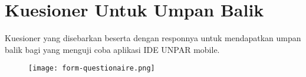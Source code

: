\chapter{Kuesioner Untuk Umpan Balik}
\label{lamp:B}

\def\scl{1}
\def\leg{} 
\def\std{none}
\def\ymin{}
\def\ymax{}

Kuesioner yang disebarkan beserta dengan responnya untuk mendapatkan umpan balik bagi yang menguji coba aplikasi IDE UNPAR mobile.

\begin{figure}[H] 
	\centering  
	\texttt{[image: form-questionaire.png]}  
	\label{fig:questionaire} 
\end{figure} 
